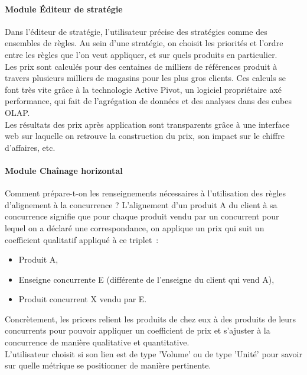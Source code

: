 \documentclass{rapportCS}
\begin{document}
\paragraph{Module Éditeur de stratégie}
Dans l'éditeur de stratégie, l'utilisateur précise des stratégies comme des ensembles de règles.
Au sein d'une stratégie, on choisit les priorités et l'ordre entre les règles que l'on veut appliquer,
et sur quels produits en particulier.\\
Les prix sont calculés pour des centaines de milliers de références produit à travers plusieurs milliers
de magasins pour les plus gros clients. Ces calculs se font très vite grâce à la technologie
Active Pivot, un logiciel propriétaire axé performance, qui fait de l'agrégation de données et
des analyses dans des cubes OLAP.\\
Les résultats des prix après application sont transparents grâce à une interface web sur 
laquelle on retrouve la construction du prix, son impact sur le chiffre d'affaires, etc.

\paragraph{Module Chaînage horizontal}
Comment prépare-t-on les renseignements nécessaires à l'utilisation des règles d'alignement à la concurrence ?
L'alignement d'un produit A du client à sa concurrence signifie que pour chaque produit vendu par un
concurrent pour lequel on a déclaré une correspondance, on applique un prix qui suit un coefficient
qualitatif appliqué à ce triplet :
\begin{itemize}
  \item Produit A,
  \item Enseigne concurrente E (différente de l'enseigne du client qui vend A),
  \item Produit concurrent X vendu par E.
\end{itemize}
Concrètement, les pricers relient les produits de chez eux à des produits de leurs concurrents 
pour pouvoir appliquer un coefficient de prix et s'ajuster à la concurrence de manière qualitative et
quantitative. \\
L'utilisateur choisit si son lien est de type 'Volume' ou de type 'Unité' pour savoir sur quelle métrique
se positionner de manière pertinente.\\
\end{document}
